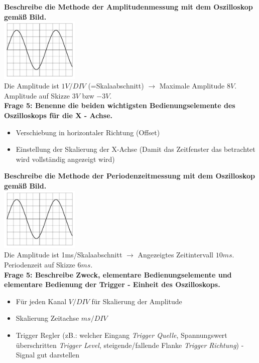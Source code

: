\documentclass[11pt,a4paper]{scrartcl}
\begin{document}
\textbf{Beschreibe die Methode der Amplitudenmessung mit dem Oszilloskop gemäß Bild.}\\
\includegraphics[height=3cm,keepaspectratio]{Oszi.png}\\
Die Amplitude ist $1V/DIV$ (=Skalaabschnitt) $\rightarrow$ Maximale Amplitude $8V$. Amplitude auf Skizze $3V$ bzw $-3V$.\\
\textbf{Frage 5: Benenne die beiden wichtigsten Bedienungselemente des Oszilloskops für die X - Achse.}\\
\begin{itemize}
	\item Verschiebung in horizontaler Richtung (Offset)
	\item Einstellung der Skalierung der X-Achse (Damit das Zeitfenster das betrachtet wird vollständig angezeigt wird)
\end{itemize}
\textbf{Beschreibe die Methode der Periodenzeitmessung mit dem Oszilloskop gemäß Bild.}\\
\includegraphics[height=3cm,keepaspectratio]{Oszi.png}\\
Die Amplitude ist 1ms/Skalaabschnitt $\rightarrow$ Angezeigtes Zeitintervall $10ms$. Periodenzeit auf Skizze $6ms$.\\
\textbf{Frage 5: Beschreibe Zweck, elementare Bedienungselemente und elementare Bedienung der Trigger - Einheit des Oszilloskops.}\\
\begin{itemize}
	\item Für jeden Kanal $V/DIV$ für Skalierung der Amplitude
	\item Skalierung Zeitachse $ms/DIV$
	\item Trigger Regler (zB.: welcher Eingang \emph{Trigger Quelle}, Spannungswert überschritten \emph{Trigger Level}, steigende/fallende Flanke \emph{Trigger Richtung}) - Signal gut darstellen
\end{itemize}\\
\end{document}
